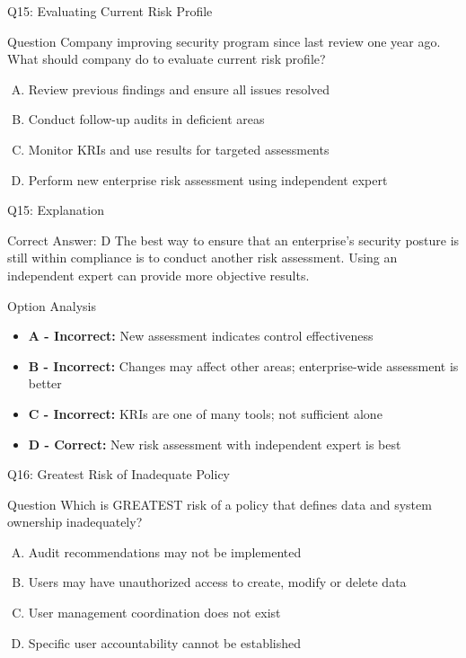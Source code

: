 \documentclass{beamer}
\begin{document}
	\begin{frame}{Q15: Evaluating Current Risk Profile}
		\begin{block}{Question}
			Company improving security program since last review one year ago. What should company do to evaluate current risk profile?
		\end{block}
		\begin{enumerate}[(A)]
			\item Review previous findings and ensure all issues resolved
			\item Conduct follow-up audits in deficient areas
			\item Monitor KRIs and use results for targeted assessments
			\item Perform new enterprise risk assessment using independent expert
		\end{enumerate}
	\end{frame}
	
	\begin{frame}{Q15: Explanation}
		\begin{block}{Correct Answer: D}
			The best way to ensure that an enterprise's security posture is still within compliance is to conduct another risk assessment. Using an independent expert can provide more objective results.
		\end{block}
		\begin{block}{Option Analysis}
			\begin{itemize}
				\item \textbf{A - Incorrect:} New assessment indicates control effectiveness
				\item \textbf{B - Incorrect:} Changes may affect other areas; enterprise-wide assessment is better
				\item \textbf{C - Incorrect:} KRIs are one of many tools; not sufficient alone
				\item \textbf{D - Correct:} New risk assessment with independent expert is best
			\end{itemize}
		\end{block}
	\end{frame}
	
	\begin{frame}{Q16: Greatest Risk of Inadequate Policy}
		\begin{block}{Question}
			Which is GREATEST risk of a policy that defines data and system ownership inadequately?
		\end{block}
		\begin{enumerate}[(A)]
			\item Audit recommendations may not be implemented
			\item Users may have unauthorized access to create, modify or delete data
			\item User management coordination does not exist
			\item Specific user accountability cannot be established
		\end{enumerate}
	\end{frame}
	
\end{document}
